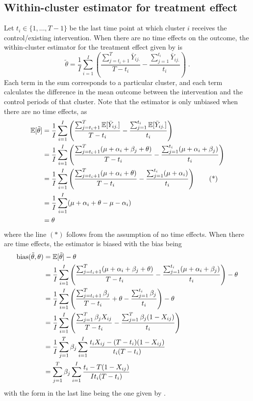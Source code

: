 \documentclass[10pt]{article}
\begin{document}
\subsection{Within-cluster estimator for treatment effect} \label{apx:estimator}

Let $t_i\in\{1,\ldots,T-1\}$ be the last time point at which cluster $i$ receives the control/existing intervention. When there are no time effects on the outcome, the within-cluster estimator for the treatment effect given by \textcite{Hussey:2007} is
\[
\tilde{\theta} = \frac{1}{I}\sum_{i=1}^I\left(\frac{\sum_{j=t_i+1}^T\bar{Y}_{ij.}}{T-t_i} - \frac{\sum_{j=1}^{t_i}\bar{Y}_{ij.}}{t_i}\right)\;.
\]
Each term in the sum corresponds to a particular cluster, and each term calculates the difference in the mean outcome between the intervention and the control periods of that cluster. Note that the estimator is only unbiased when there are no time effects, as
\begin{align*}
\mathbb{E}[\tilde{\theta}] &= \frac{1}{I}\sum_{i=1}^I\left(\frac{\sum_{j=t_i+1}^T\mathbb{E}[\bar{Y}_{ij.}]}{T-t_i} - \frac{\sum_{j=1}^{t_i}\mathbb{E}[\bar{Y}_{ij.}]}{t_i}\right) \\
&= \frac{1}{I}\sum_{i=1}^I\left(\frac{\sum_{j=t_i+1}^T(\mu+\alpha_i+\beta_j+\theta)}{T-t_i} - \frac{\sum_{j=1}^{t_i}(\mu+\alpha_i+\beta_j)}{t_i}\right) \\
&= \frac{1}{I}\sum_{i=1}^I\left(\frac{\sum_{j=t_i+1}^T(\mu+\alpha_i+\theta)}{T-t_i} - \frac{\sum_{j=1}^{t_i}(\mu+\alpha_i)}{t_i}\right) \tag{*} \\
&= \frac{1}{I}\sum_{i=1}^I(\mu+\alpha_i+\theta-\mu-\alpha_i) \\
&= \theta
\end{align*}
where the line $(*)$ follows from the assumption of no time effects. When there are time effects, the estimator is biased with the bias being
\begin{align*}
\mathrm{bias}(\tilde{\theta},\theta) &= \mathbb{E}[\tilde{\theta}] - \theta \\
&= \frac{1}{I}\sum_{i=1}^I\left(\frac{\sum_{j=t_i+1}^T(\mu+\alpha_i+\beta_j+\theta)}{T-t_i} - \frac{\sum_{j=1}^{t_i}(\mu+\alpha_i+\beta_j)}{t_i}\right) - \theta \\
&= \frac{1}{I}\sum_{i=1}^I\left(\frac{\sum_{j=t_i+1}^T\beta_j}{T-t_i} + \theta - \frac{\sum_{j=1}^{t_i}\beta_j}{t_i}\right) - \theta \\
&= \frac{1}{I}\sum_{i=1}^I\left(\frac{\sum_{j=1}^T\beta_jX_{ij}}{T-t_i} - \frac{\sum_{j=1}^T\beta_j(1-X_{ij})}{t_i}\right) \\
&= \frac{1}{I}\sum_{j=1}^T\beta_j\sum_{i=1}^I\frac{t_iX_{ij} - (T-t_i)(1-X_{ij})}{t_i(T-t_i)} \\
&= \sum_{j=1}^T\beta_j\sum_{i=1}^I\frac{t_i - T(1-X_{ij})}{It_i(T-t_i)}
\end{align*}
with the form in the last line being the one given by \citeauthor{Hussey:2007}.
\end{document}
